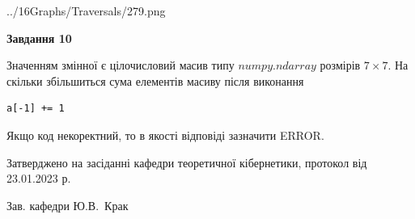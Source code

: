 \documentclass[12pt, ukrainian]{article}
\begin{document}
{\begin {large}
\begin{center}
	{../16Graphs/Traversals/279.png}
\end{center}\par
\newpage

{\begin {center}\textbf{Завдання 10}\end {center}}\par
Значенням змінної  є цілочисловий масив типу $numpy.ndarray$ розмірів $7{\times}7$. На скільки збільшиться сума елементів масиву  після виконання
\begin{verbatim}
a[-1] += 1
\end{verbatim}


Якщо код некоректний, то в якості відповіді зазначити ERROR.\par
\newpage


\end {large}
}
{\smallskip \begin {small} Затверджено на засіданні кафедри теоретичної кібернетики, протокол  від   23.01.2023 р.\par\smallskip\smallskip
{\parbox {6.5 cm}{Зав. кафедри \dotfill Ю.В.~Крак}} \end{small}}
\end{document}
